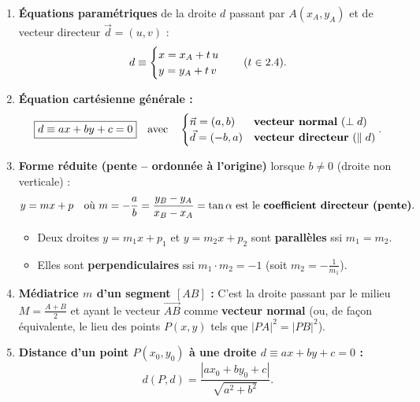 \begin{theoreme}
\begin{enumerate}
    \item \textbf{Équations paramétriques} de la droite $d$ passant par $A(x_A, y_A)$ et de vecteur directeur $\vec{d} = (u, v)$ :
    \[
        d \equiv \begin{cases} x = x_A + t\,u \\ y = y_A + t\,v \end{cases} \quad (t \in 2.4).
    \]
    \item \textbf{Équation cartésienne générale :}
    \[
        \boxed{d \equiv ax + by + c = 0} \quad \text{avec} \quad \begin{cases} \vec{n} = (a, b) & \text{\textbf{vecteur normal} ($\perp d$)} \\ \vec{d} = (-b, a) & \text{\textbf{vecteur directeur} ($\parallel d$)} \end{cases}.
    \]
    \item \textbf{Forme réduite (pente -- ordonnée à l'origine)} lorsque $b \neq 0$ (droite non verticale) :
    \[
        y = mx + p \quad \text{où } m = -\frac{a}{b} = \frac{y_B - y_A}{x_B - x_A} = \tan\alpha \text{ est le \textbf{coefficient directeur (pente)}}.
    \]
    \begin{itemize}
        \item Deux droites $y = m_1 x + p_1$ et $y = m_2 x + p_2$ sont \textbf{parallèles} ssi $m_1 = m_2$.
        \item Elles sont \textbf{perpendiculaires} ssi $\boxed{m_1 \cdot m_2 = -1}$ (soit $m_2 = -\frac{1}{m_1}$).
    \end{itemize}
    \item \textbf{Médiatrice $m$ d'un segment $[AB]$ :} C'est la droite passant par le milieu $M = \frac{A+B}{2}$ et ayant le vecteur $\overrightarrow{AB}$ comme \textbf{vecteur normal} (ou, de façon équivalente, le lieu des points $P(x,y)$ tels que $|PA|^2 = |PB|^2$).
    \item \textbf{Distance d'un point $P(x_0, y_0)$ à une droite $d \equiv ax + by + c = 0$ :}
    \[
        \boxed{d(P, d) = \frac{|ax_0 + by_0 + c|}{\sqrt{a^2 + b^2}}}.
    \]
\end{enumerate}
\end{theoreme}

